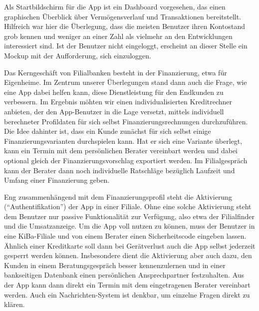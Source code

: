     Als Startbildschirm für die App ist ein Dashboard vorgesehen, das einen graphischen Überblick über Vermögensverlauf und Transaktionen bereitstellt. Hilfreich war hier die Überlegung, dass die meisten Benutzer ihren Kontostand grob kennen und weniger an einer Zahl als vielmehr an den Entwicklungen interessiert sind. Ist der Benutzer nicht eingeloggt, erscheint an dieser Stelle ein Mockup mit der Aufforderung, sich einzuloggen.
    
    Das Kerngeschäft von Filialbanken besteht in der Finanzierung, etwa für Eigenheime. Im Zentrum unserer Überlegungen stand dann auch die Frage, wie eine App dabei helfen kann, diese Dienstleistung für den Endkunden zu verbessern. Im Ergebnis möhten wir einen individualisierten Kreditrechner anbieten, der den App-Benutzer in die Lage versetzt, mittels individuell berechneter Profildaten für sich selbst Finanzierungsrechnungen durchzuführen. Die Idee dahinter ist, dass ein Kunde zunächst für sich selbst einige Finanzierungsvarianten durchspielen kann. Hat er sich eine Variante überlegt, kann ein Termin mit dem persönlichen Berater vereinbart werden und dabei optional gleich der Finanzierungsvorschlag exportiert werden. Im Filialgespräch kann der Berater dann noch individuelle Ratschläge bezüglich Laufzeit und Umfang einer Finanzierung geben.
    
	Eng zusammenhängend mit dem Finanzierungsprofil steht die Aktivierung ("`Authentifikation"') der App in einer Filiale. Ohne eine solche Aktivierung steht dem Benutzer nur passive Funktionalität zur Verfügung, also etwa der Filialfinder und die Umsatzanzeige. Um die App voll nutzen zu können, muss der Benutzer in eine KiBa-Filiale und von einem Berater einen Sicherheitscode eingeben lassen. Ähnlich einer Kreditkarte soll dann bei Gerätverlust auch die App selbst jederzeit gesperrt werden können. Insbesondere dient die Aktivierung aber auch dazu, den Kunden in einem Beratungsgespräch besser kennenzulernen und in einer bankseitigen Datenbank einen persönlichen Ansprechpartner festzuhalten. Aus der App kann dann direkt ein Termin mit dem eingetragenen Berater vereinbart werden. Auch ein Nachrichten-System ist denkbar, um einzelne Fragen direkt zu klären.